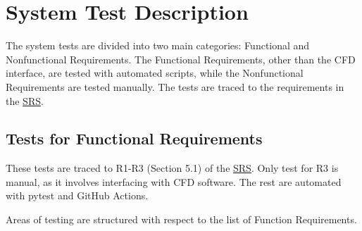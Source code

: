 \documentclass[12pt, titlepage]{article}
\begin{document}



\newpage
\section{System Test Description}

The system tests are divided into two main categories: Functional and Nonfunctional Requirements. The Functional Requirements, other than the CFD interface, are tested with automated scripts, while the Nonfunctional Requirements are tested manually. The tests are traced to the requirements in the \href{https://github.com/omltcat/turbulent-flow/blob/main/docs/SRS/SRS.pdf}{SRS}.
	
\subsection{Tests for Functional Requirements} \label{FuncTest}

These tests are traced to R1-R3 (Section 5.1) of the \href{https://github.com/omltcat/turbulent-flow/blob/main/docs/SRS/SRS.pdf}{SRS}. Only test for R3 is manual, as it involves interfacing with CFD software. The rest are automated with pytest and GitHub Actions.

Areas of testing are structured with respect to the list of Function Requirements.


\end{document}
